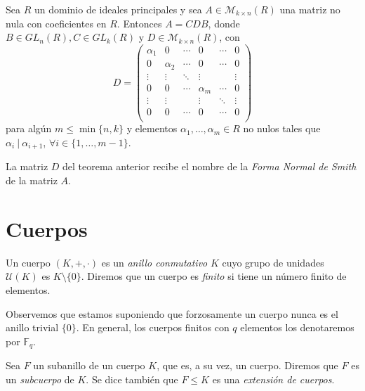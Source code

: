 \begin{teorema}
Sea $R$ un dominio de ideales principales y sea $A \in \mathcal{M}_{k \times n}(R)$ una matriz no nula con coeficientes en $R$. Entonces $A = CDB$, donde $B \in GL_n(R), C \in GL_k(R)$ y $D \in \mathcal{M}_{k \times n}(R)$, con $$ D =
    \begin{pmatrix}
    \alpha_1 & 0      & \cdots & 0      & \cdots & 0 \\
    0        & \alpha_2 & \cdots & 0      & \cdots & 0 \\
    \vdots   & \vdots & \ddots & \vdots &        & \vdots \\
    0        & 0      & \cdots & \alpha_m & \cdots & 0 \\
    \vdots   & \vdots &        & \vdots & \ddots & \vdots \\
    0        & 0      & \cdots & 0      & \cdots & 0 \\
    \end{pmatrix}$$ para algún $m \leq \min\{n,k\}$ y elementos $\alpha_1,\dots,\alpha_m \in R$ no nulos tales que \\ $\alpha_i \ | \ \alpha_{i+1}$, $\forall i \in \{1,\dots,m-1\}.$
\end{teorema}

La matriz $D$ del teorema anterior recibe el nombre de la \emph{Forma Normal de Smith} de la matriz $A$.

\section{Cuerpos}

\begin{definicion}
    Un cuerpo $(K,+,\cdot)$ es un \emph{anillo conmutativo} $K$ cuyo grupo de unidades $\mathcal{U}(K)$ es $ K\setminus\{0\}$. Diremos que un cuerpo es \emph{finito} si tiene un número finito de elementos.
\end{definicion}

Observemos que estamos suponiendo que forzosamente un cuerpo nunca es el anillo trivial $\{0\}$. En general, los cuerpos finitos con $q$ elementos los denotaremos por $\mathbb{F}_q$.

\begin{definicion}
    Sea $F$ un subanillo de un cuerpo $K$, que es, a su vez, un cuerpo. Diremos que $F$ es un \emph{subcuerpo} de $K$. Se dice también que $F \leq K$ es una \emph{extensión de cuerpos}.
\end{definicion}


